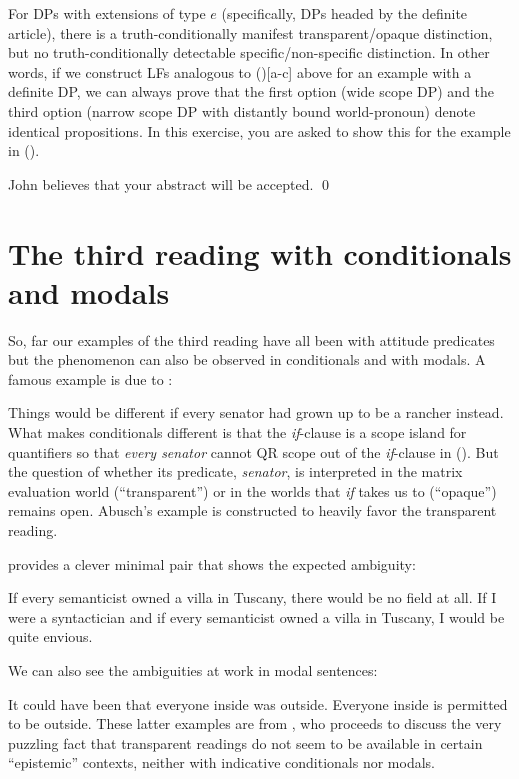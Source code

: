 \begin{exercise}\label{yourabstract}
	
	For DPs with extensions of type $e$ (specifically, DPs headed by the definite
  article), there is a truth-conditionally manifest transparent/opaque
  distinction, but no truth-conditionally detectable specific/non-specific
  distinction. In other words, if we construct LFs analogous to (\lastx)[a-c]
  above for an example with a definite DP, we can always prove that the first
  option (wide scope DP) and the third option (narrow scope DP with distantly
  bound world-pronoun) denote identical propositions. In this exercise, you are
  asked to show this for the example in (\nextx).
	
	\ex John believes that your abstract will be accepted. \qed \xe

\end{exercise}

\section{The third reading with conditionals and modals}
\label{sec:third-conditional-modal}

So, far our examples of the third reading have all been with attitude predicates
but the phenomenon can also be observed in conditionals and with modals. A
famous example is due to \cite{abusch-1994-scope-indef}:

\ex
Things would be different if every senator had grown up to be a rancher instead. 
\xe
%
What makes conditionals different is that the \emph{if}-clause is a scope island
for quantifiers so that \emph{every senator} cannot QR scope out of the
\emph{if}-clause in (\lastx). But the question of whether its predicate,
\emph{senator}, is interpreted in the matrix evaluation world (``transparent'')
or in the worlds that \emph{if} takes us to (``opaque'') remains open. Abusch's
example is constructed to heavily favor the transparent reading.

\cite{percus-2000-constraints} provides a clever minimal pair that shows the
expected ambiguity:

\pex
\a If every semanticist owned a villa in Tuscany, there would be no field
at all.
\a If I were a syntactician and if every semanticist owned a villa in Tuscany, I
would be quite envious.
\xe

We can also see the ambiguities at work in modal sentences:

\pex
\a It could have been that everyone inside was outside.
\a Everyone inside is permitted to be outside.
\xe
%
These latter examples are from \cite{yalcin-2015-epistemic-de-re}, who proceeds
to discuss the very puzzling fact that transparent readings do not seem to be
available in certain ``epistemic'' contexts, neither with indicative
conditionals nor modals.

